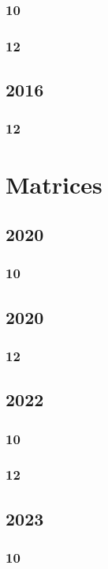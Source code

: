 \documentclass[11pt]{book}
\begin{document}
\subsection{10}

\subsection{12}


\section{2016}
\subsection{12}





\chapter{Matrices}
\section{2020}
\subsection{10}

\section{2020}
\subsection{12}

\section{2022}
\subsection{10}

\subsection{12}

\section{2023}
\subsection{10}

\end{document}
